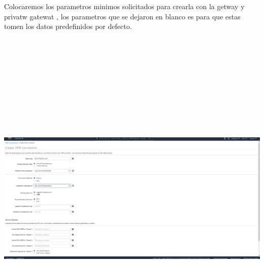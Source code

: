 \documentclass{article} %
\begin{document}
\noindent 

\noindent 

\noindent 

\noindent 

\noindent 

\noindent 

\noindent 

\noindent 

\noindent 

\noindent 

\noindent 

\noindent 

\noindent 

\noindent 

\noindent 

\noindent 

\noindent 

\noindent Colocaremos los parametros minimos solicitados para crearla con la getway y privatw gatewat , los parametros que se dejaron en blanco es para que estas tomen los datos predefinidos por defecto. 

\noindent 

\noindent \includegraphics*[width=6.05in, height=6.54in, trim=0.00in 0.21in 7.84in 0.00in]{image21}
\end{document}
